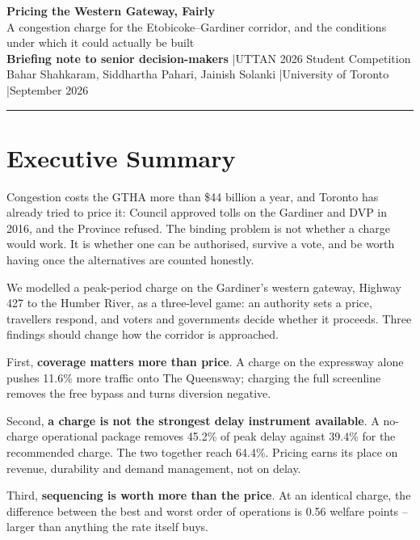 \documentclass[11pt,letterpaper]{article}
\begin{document}
\begin{singlespace}
\noindent
{\Large\bfseries Pricing the Western Gateway, Fairly}\\[2pt]
{\normalsize A congestion charge for the Etobicoke--Gardiner corridor, and the
conditions under which it could actually be built}\\[6pt]
{\small\textbf{Briefing note to senior decision-makers} \quad|\quad UTTAN 2026
Student Competition\\
Bahar Shahkaram, Siddhartha Pahari, Jainish Solanki \quad|\quad University of
Toronto \quad|\quad September 2026}
\end{singlespace}
\vspace{4pt}\hrule\vspace{4pt}

\section*{Executive Summary}

Congestion costs the GTHA more than \$44 billion a year, and Toronto has already
tried to price it: Council approved tolls on the Gardiner and DVP in 2016, and
the Province refused. The binding problem is not whether a charge would work.
It is whether one can be authorised, survive a vote, and be worth having once
the alternatives are counted honestly.

We modelled a peak-period charge on the Gardiner's western gateway, Highway 427
to the Humber River, as a three-level game: an authority sets a price,
travellers respond, and voters and governments decide whether it proceeds. Three
findings should change how the corridor is approached.

First, \textbf{coverage matters more than price}. A charge on the expressway
alone pushes 11.6\% more traffic onto The Queensway; charging the full
screenline removes the free bypass and turns diversion negative.

Second, \textbf{a charge is not the strongest delay instrument available}. A
no-charge operational package removes 45.2\% of peak delay against 39.4\% for
the recommended charge. The two together reach 64.4\%. Pricing earns its place
on revenue, durability and demand management, not on delay.

Third, \textbf{sequencing is worth more than the price}. At an identical charge,
the difference between the best and worst order of operations is 0.56 welfare
points -- larger than anything the rate itself buys.
\end{document}
